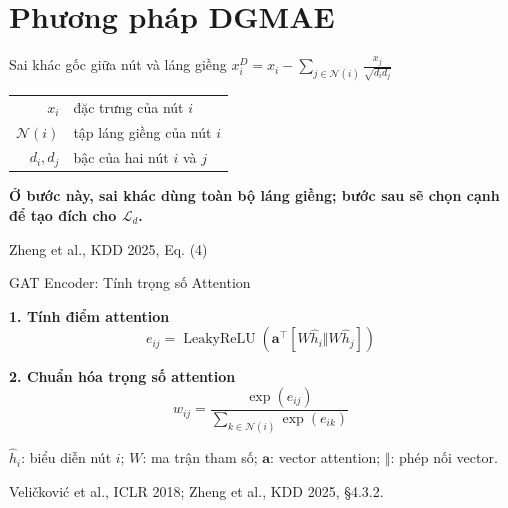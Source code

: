     
    \section{Phương pháp DGMAE}
    
    \begin{frame}{Sai khác gốc giữa nút và láng giềng}
      \centering
      \vspace{1.0em}
      {\Large $\displaystyle x_i^D=x_i-
        \sum_{j\in\mathcal N(i)}\frac{x_j}{\sqrt{d_i d_j}}$}\\[1.4em]
      {\small
        \begin{tabular}{r@{\quad}l}
          $x_i$ & đặc trưng của nút $i$ \\[0.45em]
          $\mathcal N(i)$ & tập láng giềng của nút $i$ \\[0.45em]
          $d_i, d_j$ & bậc của hai nút $i$ và $j$
        \end{tabular}
      }
      \vfill
      \textbf{Ở bước này, sai khác dùng toàn bộ láng giềng; bước sau sẽ chọn cạnh để tạo đích cho $\mathcal L_d$.}
      \vspace{0.5em}
    
      {\tiny Zheng et al., KDD 2025, Eq. (4)}
    \end{frame}
    
    \begin{frame}{GAT Encoder: Tính trọng số Attention}
      \small
    
      \textbf{1. Tính điểm attention}
      \[
        e_{ij} = \operatorname{LeakyReLU}
        \left(\mathbf{a}^{\top}
        [W\hat{h}_i \Vert W\hat{h}_j]\right)
      \]
    
      \textbf{2. Chuẩn hóa trọng số attention}
      \[
        w_{ij} =
        \frac{\exp(e_{ij})}
             {\sum_{k\in\mathcal{N}(i)}\exp(e_{ik})}
      \]
    \vspace{0.5cm}
    
      {\footnotesize
        $\hat{h}_i$: biểu diễn nút $i$;
        $W$: ma trận tham số;
        $\mathbf{a}$: vector attention;
        $\Vert$: phép nối vector.
      }
    
      {\tiny Veličković et al., ICLR 2018;
      Zheng et al., KDD 2025, \S4.3.2.}
    \end{frame}
    
